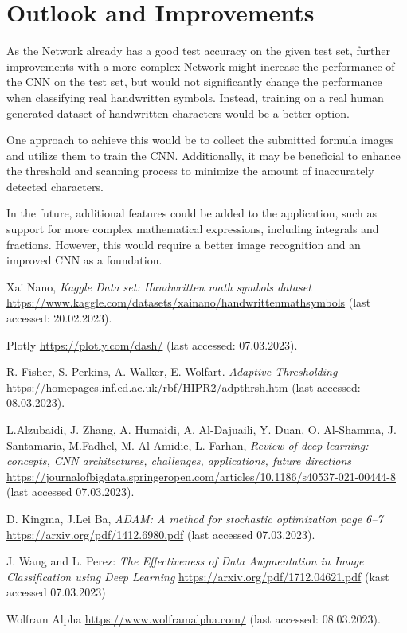 \documentclass[@CLASSOPTIONS@]{tumarticle}
\begin{document}
\section{Outlook and Improvements}

As the Network already has a good test accuracy on the given test set, further improvements with a more complex Network
might increase the performance of the CNN on the test set, but would not significantly change the performance when classifying real handwritten symbols.
Instead, training on a real human generated dataset of handwritten characters would be a better option.

One approach to achieve this would be to collect the submitted formula images and utilize them to train the CNN\@.
Additionally, it may be beneficial to enhance the threshold and scanning process
to minimize the amount of inaccurately detected characters.

In the future, additional features could be added to the application,
such as support for more complex mathematical expressions, including integrals and fractions.
However, this would require a better image recognition and an improved CNN as a foundation.

\begin{thebibliography}{10}

  Xai Nano, \emph{Kaggle Data set: Handwritten math symbols dataset}
  \url{https://www.kaggle.com/datasets/xainano/handwrittenmathsymbols}
  (last accessed: 20.02.2023).

  Plotly \url{https://plotly.com/dash/}
  (last accessed: 07.03.2023).

  R. Fisher, S. Perkins, A. Walker, E. Wolfart.
  \emph{Adaptive Thresholding}
  \url{https://homepages.inf.ed.ac.uk/rbf/HIPR2/adpthrsh.htm}
  (last accessed: 08.03.2023).

  L.Alzubaidi, J. Zhang, A. Humaidi, A. Al-Dajuaili, Y. Duan, O. Al-Shamma, J. Santamaria, M.Fadhel, M. Al-Amidie, L. Farhan,
  \emph{Review of deep learning: concepts, CNN architectures, challenges, applications, future directions}
  \url{https://journalofbigdata.springeropen.com/articles/10.1186/s40537-021-00444-8}
  (last accessed 07.03.2023).

  D. Kingma, J.Lei Ba, \emph{ADAM: A method for stochastic optimization page 6--7}
  \url{https://arxiv.org/pdf/1412.6980.pdf}
  (last accessed 07.03.2023).

  J. Wang and L. Perez: \emph{The Effectiveness of Data Augmentation in Image Classification using Deep Learning}
  \url{https://arxiv.org/pdf/1712.04621.pdf}
  (kast accessed 07.03.2023)

  Wolfram Alpha \url{https://www.wolframalpha.com/}
  (last accessed: 08.03.2023).



\end{thebibliography}
\end{document}
